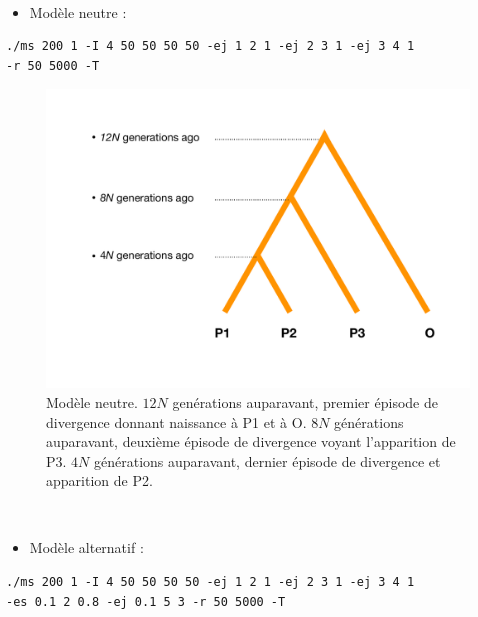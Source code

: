 \documentclass[12pt,twoside]{ugathesis}
\providecommand{\tightlist}{%
  \setlength{\itemsep}{0pt}\setlength{\parskip}{0pt}}
\begin{document}
~
\begin{itemize}
\tightlist
\item
  Modèle neutre :
\end{itemize}
\begin{verbatim}
./ms 200 1 -I 4 50 50 50 50 -ej 1 2 1 -ej 2 3 1 -ej 3 4 1 
-r 50 5000 -T 
\end{verbatim}
\begin{figure}

{\centering \includegraphics[scale=0.5]{figure/background} 

}

\caption{Modèle neutre. $12N$ genérations auparavant, premier épisode de divergence donnant naissance à P1 et à O. $8N$ générations auparavant, deuxième épisode de divergence voyant l'apparition de P3. $4N$ générations auparavant, dernier épisode de divergence et apparition de P2.}\label{fig:background}
\end{figure}
~
\begin{itemize}
\tightlist
\item
  Modèle alternatif :
\end{itemize}
\begin{verbatim}
./ms 200 1 -I 4 50 50 50 50 -ej 1 2 1 -ej 2 3 1 -ej 3 4 1 
-es 0.1 2 0.8 -ej 0.1 5 3 -r 50 5000 -T
\end{verbatim}
\end{document}
